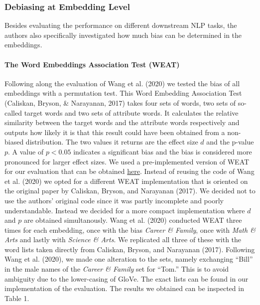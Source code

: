 \documentclass[
  english,
  man,floatsintext]{apa6}
\let\oldparagraph\paragraph
\renewcommand{\paragraph}[1]{\oldparagraph{#1}\mbox{}}
\begin{document}
\hypertarget{debiasing-at-embedding-level}{%
\subsubsection{Debiasing at Embedding Level}\label{debiasing-at-embedding-level}}

Besides evaluating the performance on different downstream NLP tasks, the authors also specifically investigated how much bias can be determined in the embeddings.

\hypertarget{the-word-embeddings-association-test-weat}{%
\paragraph{The Word Embeddings Association Test (WEAT)}\label{the-word-embeddings-association-test-weat}}

Following along the evaluation of Wang et al. (2020) we tested the bias of all embeddings with a permutation test. This Word Embedding Association Test (Caliskan, Bryson, \& Narayanan, 2017) takes four sets of words, two sets of so-called target words and two sets of attribute words. It calculates the relative similarity between the target words and the attribute words respectively and outputs how likely it is that this result could have been obtained from a non-biased distribution. The two values it returns are the effect size \(d\) and the p-value \(p\). A value of \(p<0.05\) indicates a significant bias and the bias is considered more pronounced for larger effect sizes.
We used a pre-implemented version of WEAT for our evaluation that can be obtained \href{https://github.com/shivaomrani/HumanBiasInSemantics}{here}. Instead of reusing the code of Wang et al. (2020) we opted for a different WEAT implementation that is oriented on the original paper by Caliskan, Bryson, and Narayanan (2017). We decided not to use the authors' original code since it was partly incomplete and poorly understandable. Instead we decided for a more compact implementation where \(d\) and \(p\) are obtained simultanously.
Wang et al. (2020) conducted WEAT three times for each embedding, once with the bias \emph{Career \& Family}, once with \emph{Math \& Arts} and lastly with \emph{Science \& Arts}. We replicated all three of these with the word lists taken directly from Caliskan, Bryson, and Narayanan (2017). Following Wang et al. (2020), we made one alteration to the sets, namely exchanging ``Bill'' in the male names of the \emph{Career \& Family} set for ``Tom.'' This is to avoid ambiguity due to the lower-casing of GloVe. The exact lists can be found in our implementation of the evaluation.
The results we obtained can be inspected in Table 1.
\end{document}
